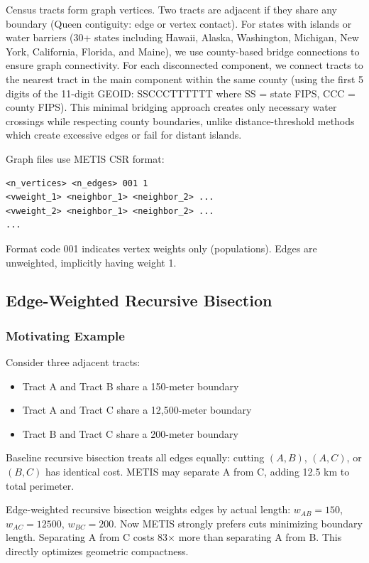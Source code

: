 Census tracts form graph vertices. Two tracts are adjacent if they share any boundary (Queen contiguity: edge or vertex contact). For states with islands or water barriers (30+ states including Hawaii, Alaska, Washington, Michigan, New York, California, Florida, and Maine), we use county-based bridge connections to ensure graph connectivity. For each disconnected component, we connect tracts to the nearest tract in the main component within the same county (using the first 5 digits of the 11-digit GEOID: SSCCCTTTTTT where SS = state FIPS, CCC = county FIPS). This minimal bridging approach creates only necessary water crossings while respecting county boundaries, unlike distance-threshold methods which create excessive edges or fail for distant islands.

Graph files use METIS CSR format:
\begin{verbatim}
<n_vertices> <n_edges> 001 1
<vweight_1> <neighbor_1> <neighbor_2> ...
<vweight_2> <neighbor_1> <neighbor_2> ...
...
\end{verbatim}

Format code 001 indicates vertex weights only (populations). Edges are unweighted, implicitly having weight 1.

\subsection{Edge-Weighted Recursive Bisection}

\subsubsection{Motivating Example}

Consider three adjacent tracts:
\begin{itemize}
\item Tract A and Tract B share a 150-meter boundary
\item Tract A and Tract C share a 12,500-meter boundary
\item Tract B and Tract C share a 200-meter boundary
\end{itemize}

Baseline recursive bisection treats all edges equally: cutting $(A,B)$, $(A,C)$, or $(B,C)$ has identical cost. METIS may separate A from C, adding 12.5 km to total perimeter.

Edge-weighted recursive bisection weights edges by actual length: $w_{AB} = 150$, $w_{AC} = 12500$, $w_{BC} = 200$. Now METIS strongly prefers cuts minimizing boundary length. Separating A from C costs 83× more than separating A from B. This directly optimizes geometric compactness.

